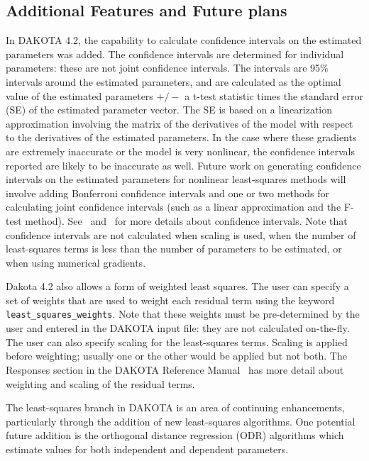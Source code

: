 \subsection{Additional Features and Future plans}\label{nls:solution:future}

In DAKOTA 4.2, the capability to calculate confidence 
intervals on the estimated parameters was added.  The confidence 
intervals are determined for individual parameters: 
these are not joint confidence intervals.  The intervals are 95\% 
intervals around the estimated parameters, and are calculated as 
the optimal value of the estimated parameters $+/-$ a 
t-test statistic times the standard error (SE) of the estimated 
parameter vector.  
The SE is based on a linearization approximation involving the 
matrix of the derivatives of the model with respect to the 
derivatives of the estimated parameters.  In the case where 
these gradients are extremely inaccurate or the model is very nonlinear, 
the confidence intervals reported are likely to be inaccurate as well. 
Future work on generating confidence intervals on the estimated 
parameters for nonlinear least-squares methods will involve 
adding Bonferroni confidence intervals and one or two methods for 
calculating joint confidence intervals (such as a linear approximation 
and the F-test method). See~\cite{Seb03} and~\cite{Vug07} for more 
details about confidence intervals. Note that confidence intervals 
are not calculated when scaling is used, when the number of 
least-squares terms is less than the number of parameters to 
be estimated, or when using numerical gradients. 

Dakota 4.2 also allows a form of weighted least squares. 
The user can specify a set of weights that are used to 
weight each residual term using the keyword \texttt{least\_squares\_weights}.
Note that these weights must be pre-determined by the user 
and entered in the DAKOTA input file: they are not calculated on-the-fly.
The user can also specify scaling for the least-squares terms. 
Scaling is applied before weighting; usually one or the other would be 
applied but not both.  The Responses section in the DAKOTA
Reference Manual~\cite{RefMan} has more detail about weighting and scaling
of the residual terms.

The least-squares branch in DAKOTA is an area of continuing
enhancements, particularly through the addition of new least-squares
algorithms. One potential future addition is the orthogonal distance
regression (ODR) algorithms which estimate values for both independent
and dependent parameters.

